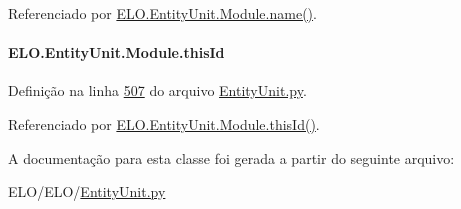 Referenciado por \hyperlink{classELO_1_1EntityUnit_1_1Module_a604913f594f7331394d14c26b636866f}{E\+L\+O.\+Entity\+Unit.\+Module.\+name()}.

\hypertarget{classELO_1_1EntityUnit_1_1Module_a02fe16e41dd435364cb9073a8a805e96}{}
\paragraph[{this\+Id}]{\setlength{\rightskip}{0pt plus 5cm}E\+L\+O.\+Entity\+Unit.\+Module.\+this\+Id}\label{classELO_1_1EntityUnit_1_1Module_a02fe16e41dd435364cb9073a8a805e96}


Definição na linha \hyperlink{EntityUnit_8py_source_l00507}{507} do arquivo \hyperlink{EntityUnit_8py_source}{Entity\+Unit.\+py}.



Referenciado por \hyperlink{classELO_1_1EntityUnit_1_1Module_a0f632ea2543ec7d67da765650e58593c}{E\+L\+O.\+Entity\+Unit.\+Module.\+this\+Id()}.



A documentação para esta classe foi gerada a partir do seguinte arquivo\+:\begin{DoxyCompactItemize}
\item 
E\+L\+O/\+E\+L\+O/\hyperlink{EntityUnit_8py}{Entity\+Unit.\+py}\end{DoxyCompactItemize}

